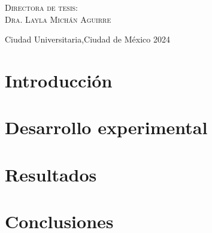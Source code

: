 \documentclass[letterpaper,12pt,oneside]{book}
\begin{document}
\begin{titlepage}
\begin{minipage}[c][0.81\textheight][t]{0.75\textwidth}
\begin{center}
                \vspace{0.5cm}

                {\large\scshape Directora de tesis:\\[0.3cm] {Dra. Layla Michán Aguirre }}\\[.2in]

                \vspace{0.5cm}

                \large{Ciudad Universitaria,Ciudad de México}{ }{2024}
            \end{center}
        \end{minipage}
    \end{titlepage}



\frontmatter



\tableofcontents
\mainmatter %


\chapter{Introducción}


\chapter{Desarrollo experimental}


\chapter{Resultados}


\chapter{Conclusiones}



\backmatter%





\end{document}
